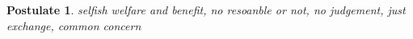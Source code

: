 \documentclass{article}
\newtheorem{postulate}{Postulate}
\begin{document}
\begin{postulate}
    selfish welfare and benefit,
    no resoanble or not,
    no  judgement,
    just exchange,
    common concern
\end{postulate}
\end{document}
